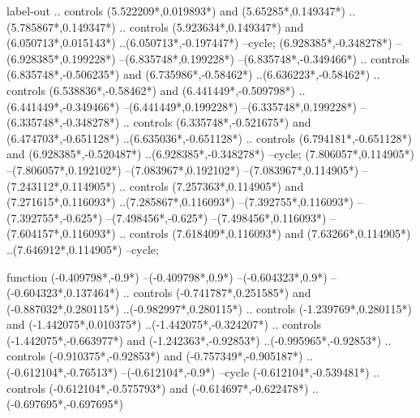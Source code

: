 {\begin{scope}[x=1mm,y=1mm,line width=\SCstroke mm,line cap=round,line join=round]
\begin{SCpart}{label-out}
.. controls ({5.522209*\SCF},{0.019893*\SCF}) and ({5.65285*\SCF},{0.149347*\SCF}) ..({5.785867*\SCF},{0.149347*\SCF})
.. controls ({5.923634*\SCF},{0.149347*\SCF}) and ({6.050713*\SCF},{0.015143*\SCF}) ..({6.050713*\SCF},{-0.197447*\SCF})
--cycle;
 ({6.928385*\SCF},{-0.348278*\SCF})
--({6.928385*\SCF},{0.199228*\SCF})
--({6.835748*\SCF},{0.199228*\SCF})
--({6.835748*\SCF},{-0.349466*\SCF})
.. controls ({6.835748*\SCF},{-0.506235*\SCF}) and ({6.735986*\SCF},{-0.58462*\SCF}) ..({6.636223*\SCF},{-0.58462*\SCF})
.. controls ({6.538836*\SCF},{-0.58462*\SCF}) and ({6.441449*\SCF},{-0.509798*\SCF}) ..({6.441449*\SCF},{-0.349466*\SCF})
--({6.441449*\SCF},{0.199228*\SCF})
--({6.335748*\SCF},{0.199228*\SCF})
--({6.335748*\SCF},{-0.348278*\SCF})
.. controls ({6.335748*\SCF},{-0.521675*\SCF}) and ({6.474703*\SCF},{-0.651128*\SCF}) ..({6.635036*\SCF},{-0.651128*\SCF})
.. controls ({6.794181*\SCF},{-0.651128*\SCF}) and ({6.928385*\SCF},{-0.520487*\SCF}) ..({6.928385*\SCF},{-0.348278*\SCF})
--cycle;
 ({7.806057*\SCF},{0.114905*\SCF})
--({7.806057*\SCF},{0.192102*\SCF})
--({7.083967*\SCF},{0.192102*\SCF})
--({7.083967*\SCF},{0.114905*\SCF})
--({7.243112*\SCF},{0.114905*\SCF})
.. controls ({7.257363*\SCF},{0.114905*\SCF}) and ({7.271615*\SCF},{0.116093*\SCF}) ..({7.285867*\SCF},{0.116093*\SCF})
--({7.392755*\SCF},{0.116093*\SCF})
--({7.392755*\SCF},{-0.625*\SCF})
--({7.498456*\SCF},{-0.625*\SCF})
--({7.498456*\SCF},{0.116093*\SCF})
--({7.604157*\SCF},{0.116093*\SCF})
.. controls ({7.618409*\SCF},{0.116093*\SCF}) and ({7.63266*\SCF},{0.114905*\SCF}) ..({7.646912*\SCF},{0.114905*\SCF})
--cycle;
\end{SCpart}
\begin{SCpart}{function}
 ({-0.409798*\SCF},{-0.9*\SCF})
--({-0.409798*\SCF},{0.9*\SCF})
--({-0.604323*\SCF},{0.9*\SCF})
--({-0.604323*\SCF},{0.137464*\SCF})
.. controls ({-0.741787*\SCF},{0.251585*\SCF}) and ({-0.887032*\SCF},{0.280115*\SCF}) ..({-0.982997*\SCF},{0.280115*\SCF})
.. controls ({-1.239769*\SCF},{0.280115*\SCF}) and ({-1.442075*\SCF},{0.010375*\SCF}) ..({-1.442075*\SCF},{-0.324207*\SCF})
.. controls ({-1.442075*\SCF},{-0.663977*\SCF}) and ({-1.242363*\SCF},{-0.92853*\SCF}) ..({-0.995965*\SCF},{-0.92853*\SCF})
.. controls ({-0.910375*\SCF},{-0.92853*\SCF}) and ({-0.757349*\SCF},{-0.905187*\SCF}) ..({-0.612104*\SCF},{-0.76513*\SCF})
--({-0.612104*\SCF},{-0.9*\SCF})
--cycle
({-0.612104*\SCF},{-0.539481*\SCF})
.. controls ({-0.612104*\SCF},{-0.575793*\SCF}) and ({-0.614697*\SCF},{-0.622478*\SCF}) ..({-0.697695*\SCF},{-0.697695*\SCF})

\end{SCpart}
\end{scope}}
